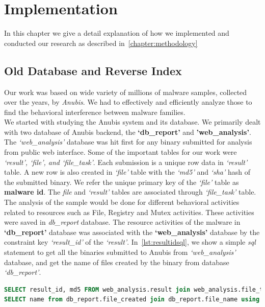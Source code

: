 \chapter{Implementation}\label{chapter:implementation}
In this chapter we give a detail explanation of how we implemented and conducted our research as described in~\autoref{chapter:methodology}
\section{Old Database and Reverse Index}
Our work was based on wide variety of millions of malware samples, collected over the years, by \emph{Anubis}.
We had to effectively and efficiently analyze those to find the behavioral interference between malware families.\\
We started with studying the Anubis system and its database.
We primarily dealt with two database of Anubis backend, the \textbf{`db\_report'} and \textbf{'web\_analysis'}.
The \emph{`web\_analysis'} database was hit first for any binary submitted for analysis from public web interface.
Some of the important tables for our work were \emph{`result', `file', and `file\_task'}.
Each submission is a unique row data in \emph{`result'} table.
A new row is also created in \emph{`file'} table with the \emph{`md5'} and \emph{`sha'} hash of the submitted binary.
We refer the unique primary key of the \emph{`file'} table as \textbf{malware id}.
The \emph{file} and \emph{`result'} tables are associated through \emph{`file\_task'} table.
The analysis of the sample would be done for different behavioral activities related to resources such as File, Registry and Mutex activities.
These activities were saved in \emph{db\_report} database.
The resource activities of the malware in \textbf{`db\_report'} database was associated with the \textbf{`web\_analysis'} database by the constraint key \textit{`result\_id'} of the \emph{`result'}.
In~\autoref{lst:resultidsql}, we show a simple \emph{sql} statement to get all the binaries submitted to Anubis from \emph{`web\_analysis'} database, and get the name of files created by the binary from database \emph{`db\_report'}.
\begin{lstlisting}[language=sql,caption={sql showing database structure to get file created activities of a malware sample},label={lst:resultidsql}]
SELECT result_id, md5 FROM web_analysis.result join web_analysis.file_task using (task_id) join web_analysis.file using (file_id) WHERE task_id = result_id;
SELECT name from db_report.file_created join db_report.file_name using (file_name_id) where result_id = '12345';
\end{lstlisting}
